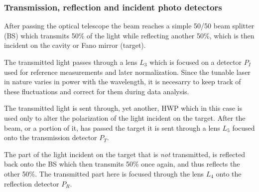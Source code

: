 \subsubsection{Transmission, reflection and incident photo detectors}

After passing the optical telescope the beam reaches a simple 50/50 beam splitter (BS) which transmits 50\% of the light while reflecting another 50\%, which is then incident on the cavity or Fano mirror (target). 

The transmitted light passes through a lens $L_3$ which is focused on a detector $P_I$ used for reference measurements and later normalization. Since the tunable laser in nature varies in power with the wavelength, it is necesarry to keep track of these fluctuations and correct for them during data analysis. 

The transmitted light is sent through, yet another, HWP which in this case is used only to alter the polarization of the light incident on the target. After the beam, or a portion of it, has passed the target it is sent through a lens $L_5$ focused onto the transmission detector $P_T$.

The part of the light incident on the target that is \emph{not} transmitted, is reflected back onto the BS which then transmits 50\% once again, and thus reflects the other 50\%. The transmitted part here is focused through the lens $L_4$ onto the reflection detector $P_R$.

